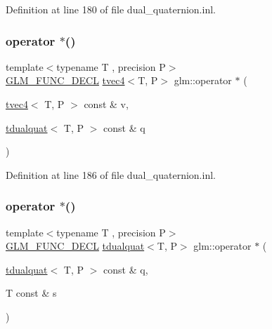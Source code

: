 Definition at line 180 of file dual\+\_\+quaternion.\+inl.

\mbox{\label{group__gtx__dual__quaternion_ga86c03ef63303143897cb83fa308a459c}} 
\subsubsection{\texorpdfstring{operator $\ast$()}{operator *()}\hspace{0.1cm}{\footnotesize\ttfamily [5/7]}}
{\footnotesize\ttfamily template$<$typename T , precision P$>$ \\
\mbox{\hyperlink{setup_8hpp_ab2d052de21a70539923e9bcbf6e83a51}{G\+L\+M\+\_\+\+F\+U\+N\+C\+\_\+\+D\+E\+CL}} \mbox{\hyperlink{structglm_1_1tvec4}{tvec4}}$<$T, P$>$ glm\+::operator $\ast$ (\begin{DoxyParamCaption}\item[{\mbox{\hyperlink{structglm_1_1tvec4}{tvec4}}$<$ T, P $>$ const \&}]{v,  }\item[{\mbox{\hyperlink{structglm_1_1tdualquat}{tdualquat}}$<$ T, P $>$ const \&}]{q }\end{DoxyParamCaption})}



Definition at line 186 of file dual\+\_\+quaternion.\+inl.

\mbox{\label{group__gtx__dual__quaternion_ga4a6cc7370cdc034ece6e7f948a67979b}} 
\subsubsection{\texorpdfstring{operator $\ast$()}{operator *()}\hspace{0.1cm}{\footnotesize\ttfamily [6/7]}}
{\footnotesize\ttfamily template$<$typename T , precision P$>$ \\
\mbox{\hyperlink{setup_8hpp_ab2d052de21a70539923e9bcbf6e83a51}{G\+L\+M\+\_\+\+F\+U\+N\+C\+\_\+\+D\+E\+CL}} \mbox{\hyperlink{structglm_1_1tdualquat}{tdualquat}}$<$T, P$>$ glm\+::operator $\ast$ (\begin{DoxyParamCaption}\item[{\mbox{\hyperlink{structglm_1_1tdualquat}{tdualquat}}$<$ T, P $>$ const \&}]{q,  }\item[{T const \&}]{s }\end{DoxyParamCaption})}



